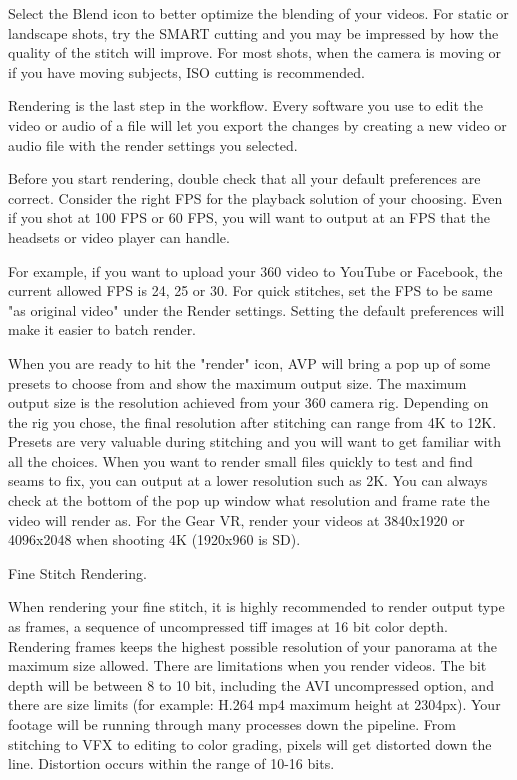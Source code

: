 \begin{fullwidth}
Select the Blend icon to better optimize the blending of your videos. For static or landscape shots, try the SMART cutting and you may be impressed by how the quality of the stitch will improve. For most shots, when the camera is moving or if you have moving subjects, ISO cutting is recommended.

Rendering is the last step in the workflow. Every software you use to edit the video or audio of a file will let you export the changes by creating a new video or audio file with the render settings you selected.

Before you start rendering, double check that all your default preferences are correct. Consider the right FPS for the playback solution of your choosing. Even if you shot at 100 FPS or 60 FPS, you will want to output at an FPS that the headsets or video player can handle. 

For example, if you want to upload your 360 video to YouTube or Facebook, the current allowed FPS is 24, 25 or 30. For quick stitches, set the FPS to be same "as original video" under the Render settings. Setting the default preferences will make it easier to batch render.


When you are ready to hit the "render" icon, AVP will bring a pop up of some presets to choose from and show the maximum output size. The maximum output size is the resolution achieved from your 360 camera rig. Depending on the rig you chose, the final resolution after stitching can range from 4K to 12K. Presets are very valuable during stitching and you will want to get familiar with all the choices. When you want to render small files quickly to test and find seams to fix, you can output at a lower resolution such as 2K. You can always check at the bottom of the pop up window what resolution and frame rate the video will render as. For the Gear VR, render your videos at 3840x1920 or 4096x2048 when shooting 4K (1920x960 is SD).

{\large Fine Stitch Rendering. \par}

When rendering your fine stitch, it is highly recommended to render output type as frames, a sequence of uncompressed tiff images at 16 bit color depth. Rendering frames keeps the highest possible resolution of your panorama at the maximum size allowed. There are limitations when you render videos. The bit depth will be between 8 to 10 bit, including the AVI uncompressed option, and there are size limits (for example: H.264 mp4 maximum height at 2304px). Your footage will be running through many processes down the pipeline. From stitching to VFX to editing to color grading, pixels will get distorted down the line. Distortion occurs within the range of 10-16 bits. 


\end{fullwidth}
